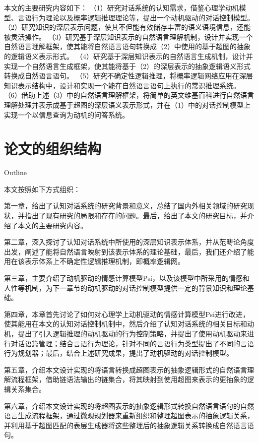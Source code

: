        本文的主要研究内容如下：
（1）研究对话系统的认知需求，借鉴心理学动机模型、言语行为理论以及概率逻辑推理理论等，提出一个动机驱动的对话控制模型。
（2）研究知识的深层表示问题，使其不但能有效储存丰富的语义语境信息，还能被灵活操作。
（3）研究基于深层知识表示的自然语言理解机制，设计并实现一个自然语言理解框架，使其能将自然语言语句转换成（2）中使用的基于超图的抽象的逻辑语义表示形式。
（4）研究基于深层知识表示的自然语言生成机制，设计并实现一个自然语言生成框架，使其能将基于（2）的深层表示的抽象逻辑语义形式转换成自然语言语句。
（5）研究不确定性逻辑推理，将概率逻辑网络应用在深层知识表示结构中，设计和实现一个能在自然语言语句上执行的常识推理系统。
（6）借助上述（3）中的自然语言理解框架，将简单的英文维基百科进行自然语言理解处理并表示成基于超图的深层语义表示形式，并在（1）中的对话控制模型上实现一个以信息查询为动机的问答系统。

\section{论文的组织结构}{Outline}

本文按照如下方式组织：

第一章，给出了认知对话系统的研究背景和意义，总结了国内外相关领域的研究现状，并指出了现有研究的局限和存在的问题。最后，给出了本文的研究目标，并介绍了本文的主要研究内容。

第二章，深入探讨了认知对话系统中所使用的深层知识表示体系，并从范畴论角度出发，阐述了能将自然语言映射到该表示体系的理论基础，最后，我们还介绍了能用在该表示体系上不确定性逻辑推理机制，即概率逻辑网。

第三章，主要介绍了动机驱动的情感计算模型Psi，以及该模型中所采用的情感和人性等机制，为下一章节的动机驱动的对话控制模型提供一定的背景知识和理论基础。

第四章，本章首先讨论了如何对心理学上动机驱动的情感计算模型Psi进行改进，使其能用在本文的认知对话控制机制中，然后介绍了认知对话系统的相关目标和动机，提出了引入逻辑推理的动机驱动的行为控制策略，并提出了使用动机驱动来进行对话语篇管理；结合言语行为理论，针对不同的言语行为类型提出了不同的言语行为规划器；最后，结合上述研究成果，提出了动机驱动的对话控制模型。

第五章，介绍本文设计实现的将语言转换成超图表示的抽象逻辑形式的自然语言理解流程框架，借助链语法输出的链集合，将其映射到使用超图来表示的更抽象的逻辑关系集合。

第六章，介绍本文设计实现的将超图表示的抽象逻辑形式转换自然语言语句的自然语言生成流程框架，通过微观规划器来重新组织和整理超图表示的抽象逻辑关系，并利用基于超图匹配的表层生成器将这些整理后的抽象逻辑关系转换成自然语言语句。

